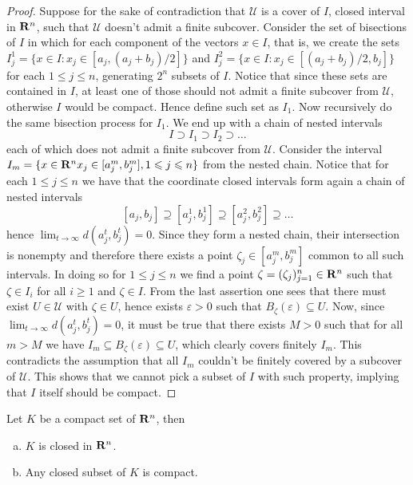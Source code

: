 \begin{proof}
Suppose for the sake of contradiction that \(\mathcal U\) is a cover of \(I\),
closed interval in \(\mathbf{R}^n\), such that \(\mathcal U\) doesn't admit a finite
subcover. Consider the set of bisections of \(I\) in which for each component
of the vectors \(x \in I\), that is, we create the sets \(I_j^1 = \{x \in I \colon
x_j \in [a_j, (a_j + b_j)/2]\}\) and \(I_j^2 = \{x \in I \colon x_j \in [(a_j +
b_j)/2, b_j]\}\) for each \(1 \leq j \leq n\), generating \(2^n\) subsets of
\(I\). Notice that since these sets are contained in \(I\), at least one of
those should not admit a finite subcover from \(\mathcal U\), otherwise \(I\)
would be compact. Hence define such set as \(I_1\). Now recursively do the
same bisection process for \(I_1\). We end up with a chain of nested intervals
\[
I \supset I_1 \supset I_2 \supset \dots
\]
each of which does not admit a finite subcover from \(\mathcal U\). Consider
the interval \(I_m = \{x \in \mathbf{R}^n \relax x_j \in [a^m_j, b_j^m], 1 \leqslant j \leqslant n\}\)
from the nested chain. Notice that for each \(1 \leq j \leq n\) we have that
the coordinate closed intervals form again a chain of nested intervals
\[
[a_j, b_j] \supseteq [a_j^1, b_j^1] \supseteq [a_j^2, b_j^2] \supseteq \dots
\]
hence \(\lim_{t \to \infty} d(a_j^t, b_j^t) = 0\). Since they form a nested
chain, their intersection is nonempty and therefore there exists a point
\(\zeta_j \in  [a_j^m, b_j^m]\) common to all such intervals. In doing so for
\(1 \leq j \leq n\) we find a point \(\zeta = (\zeta_j)_{j=1}^n \in \mathbf{R}^n\)
such that \(\zeta \in I_i\) for all \(i \geq 1\) and \(\zeta \in I\). From the
last assertion one sees that there must exist \(U \in \mathcal U\) with
\(\zeta \in U\), hence exists \(\varepsilon > 0\) such that
\(B_\zeta(\varepsilon) \subseteq U\). Now, since \(\lim_{t \to \infty}
d(a_j^t, b_j^t) = 0\), it must be true that there exists \(M > 0\) such that
for all \(m > M\) we have \(I_m \subseteq B_\zeta(\varepsilon) \subseteq U\),
which clearly covers finitely \(I_m\). This contradicts the assumption that
all \(I_m\) couldn't be finitely covered by a subcover of \(\mathcal U\). This
shows that we cannot pick a subset of \(I\) with such property, implying that
\(I\) itself should be compact.
\end{proof}

\begin{proposition}\label{prop: compact-close}
Let \(K\) be a compact set of \(\mathbf{R}^n\), then
\begin{enumerate}[(a)]
\item \(K\) is closed in \(\mathbf{R}^n\).
\item Any closed subset of \(K\) is compact.
\end{enumerate}
\end{proposition}

